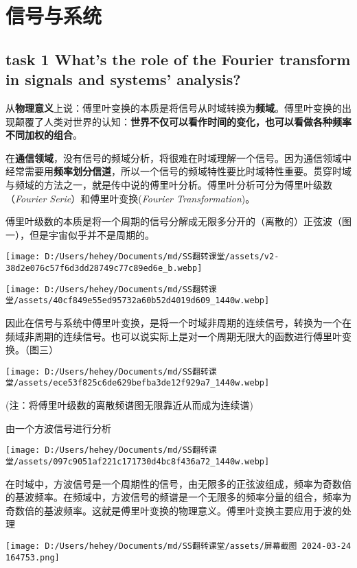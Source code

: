 \documentclass[
]{article}
\author{}
\date{}
\begin{document}
\section{信号与系统}\label{ux4fe1ux53f7ux4e0eux7cfbux7edf}

\subsection{task 1 What's the role of the Fourier transform in signals
and systems'
analysis?}\label{task-1-whats-the-role-of-the-fourier-transform-in-signals-and-systems-analysis}

从\textbf{物理意义}上说：傅里叶变换的本质是将信号从时域转换为\textbf{频域}。傅里叶变换的出现颠覆了人类对世界的认知：\textbf{世界不仅可以看作时间的变化，也可以看做各种频率不同加权的组合}。

在\textbf{通信领域}，没有信号的频域分析，将很难在时域理解一个信号。因为通信领域中经常需要用\textbf{频率划分信道}，所以一个信号的频域特性要比时域特性重要。贯穿时域与频域的方法之一，就是传中说的傅里叶分析。傅里叶分析可分为傅里叶级数（\emph{Fourier
Serie}）和傅里叶变换(\emph{Fourier Transformation})。

傅里叶级数的本质是将一个周期的信号分解成无限多分开的（离散的）正弦波（图一），但是宇宙似乎并不是周期的。

\texttt{[image: D:/Users/hehey/Documents/md/SS翻转课堂/assets/v2-38d2e076c57f6d3dd28749c77c89ed6e\_b.webp]}

\texttt{[image: D:/Users/hehey/Documents/md/SS翻转课堂/assets/40cf849e55ed95732a60b52d4019d609\_1440w.webp]}

因此在信号与系统中傅里叶变换，是将一个时域非周期的连续信号，转换为一个在频域非周期的连续信号。也可以说实际上是对一个周期无限大的函数进行傅里叶变换。（图三）

\texttt{[image: D:/Users/hehey/Documents/md/SS翻转课堂/assets/ece53f825c6de629befba3de12f929a7\_1440w.webp]}

(注：将傅里叶级数的离散频谱图无限靠近从而成为连续谱)

由一个方波信号进行分析

\texttt{[image: D:/Users/hehey/Documents/md/SS翻转课堂/assets/097c9051af221c171730d4bc8f436a72\_1440w.webp]}

在时域中，方波信号是一个周期性的信号，由无限多的正弦波组成，频率为奇数倍的基波频率。在频域中，方波信号的频谱是一个无限多的频率分量的组合，频率为奇数倍的基波频率。这就是傅里叶变换的物理意义。傅里叶变换主要应用于波的处理

\texttt{[image: D:/Users/hehey/Documents/md/SS翻转课堂/assets/屏幕截图 2024-03-24 164753.png]}
\end{document}
